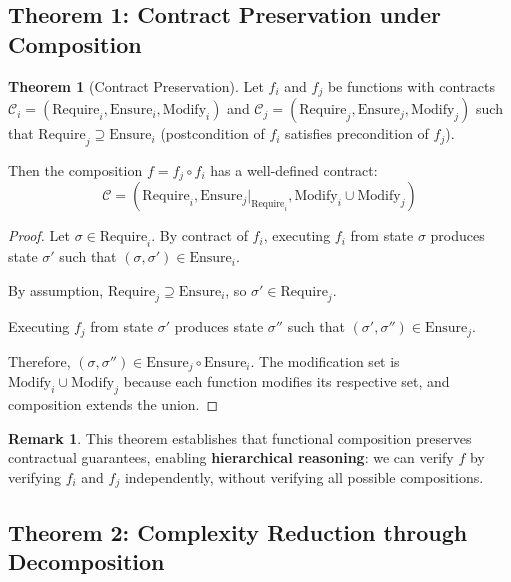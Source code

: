 \documentclass[a4paper,12pt]{article}
\theoremstyle{definition}
\newtheorem{theorem}{Theorem}
\newtheorem{remark}{Remark}
\begin{document}
\subsection{Theorem 1: Contract Preservation under Composition}

\begin{theorem}[Contract Preservation]
\label{thm:contract_preservation}
Let $f_i$ and $f_j$ be functions with contracts $\mathcal{C}_i = (\mathrm{Require}_i, \mathrm{Ensure}_i, \mathrm{Modify}_i)$ and $\mathcal{C}_j = (\mathrm{Require}_j, \mathrm{Ensure}_j, \mathrm{Modify}_j)$ such that $\mathrm{Require}_j \supseteq \mathrm{Ensure}_i$ (postcondition of $f_i$ satisfies precondition of $f_j$).

Then the composition $f = f_j \circ f_i$ has a well-defined contract:
\[
\mathcal{C} = (\mathrm{Require}_i, \mathrm{Ensure}_j|_{\mathrm{Require}_i}, \mathrm{Modify}_i \cup \mathrm{Modify}_j)
\]
\end{theorem}

\begin{proof}
Let $\sigma \in \mathrm{Require}_i$. By contract of $f_i$, executing $f_i$ from state $\sigma$ produces state $\sigma'$ such that $(\sigma, \sigma') \in \mathrm{Ensure}_i$.

By assumption, $\mathrm{Require}_j \supseteq \mathrm{Ensure}_i$, so $\sigma' \in \mathrm{Require}_j$.

Executing $f_j$ from state $\sigma'$ produces state $\sigma''$ such that $(\sigma', \sigma'') \in \mathrm{Ensure}_j$.

Therefore, $(\sigma, \sigma'') \in \mathrm{Ensure}_j \circ \mathrm{Ensure}_i$. The modification set is $\mathrm{Modify}_i \cup \mathrm{Modify}_j$ because each function modifies its respective set, and composition extends the union. \qedhere
\end{proof}

\begin{remark}
This theorem establishes that functional composition preserves contractual guarantees, enabling \textbf{hierarchical reasoning}: we can verify $f$ by verifying $f_i$ and $f_j$ independently, without verifying all possible compositions.
\end{remark}

\subsection{Theorem 2: Complexity Reduction through Decomposition}
\end{document}
